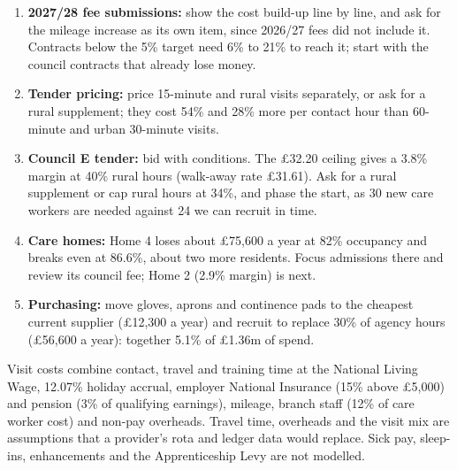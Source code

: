 \documentclass[10pt]{article}
\newcommand{\head}[1]{\vspace{3pt}{\color{piccteal}\bfseries\large #1}\par\vspace{1pt}}
\begin{document}
\head{Recommendations}
\begin{enumerate}
\item \textbf{2027/28 fee submissions:} show the cost build-up line by line, and ask for the mileage increase as its own item, since 2026/27 fees did not include it. Contracts below the 5\% target need 6\% to 21\% to reach it; start with the council contracts that already lose money.
\item \textbf{Tender pricing:} price 15-minute and rural visits separately, or ask for a rural supplement; they cost 54\% and 28\% more per contact hour than 60-minute and urban 30-minute visits.
\item \textbf{Council E tender:} bid with conditions. The \pounds32.20 ceiling gives a 3.8\% margin at 40\% rural hours (walk-away rate \pounds31.61). Ask for a rural supplement or cap rural hours at 34\%, and phase the start, as 30 new care workers are needed against 24 we can recruit in time.
\item \textbf{Care homes:} Home 4 loses about \pounds75,600 a year at 82\% occupancy and breaks even at 86.6\%, about two more residents. Focus admissions there and review its council fee; Home 2 (2.9\% margin) is next.
\item \textbf{Purchasing:} move gloves, aprons and continence pads to the cheapest current supplier (\pounds12,300 a year) and recruit to replace 30\% of agency hours (\pounds56,600 a year): together 5.1\% of \pounds1.36m of spend.
\end{enumerate}

\head{Method and limits}
Visit costs combine contact, travel and training time at the National Living Wage, 12.07\% holiday accrual, employer National Insurance (15\% above \pounds5,000) and pension (3\% of qualifying earnings), mileage, branch staff (12\% of care worker cost) and non-pay overheads. Travel time, overheads and the visit mix are assumptions that a provider's rota and ledger data would replace. Sick pay, sleep-ins, enhancements and the Apprenticeship Levy are not modelled.
\end{document}
